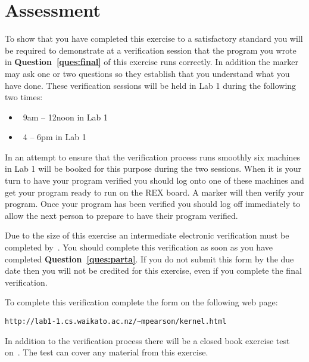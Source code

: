 \documentclass[a4paper,10pt]{article}
\begin{document}

\section{Assessment}

To show that you have completed this exercise to a satisfactory
standard you will be required to demonstrate at a verification session
that the program you wrote in \textbf{Question~\ref{ques:final}} of
this exercise runs correctly. In addition the marker may ask one or
two questions so they establish that you understand what you have
done.  These verification sessions will be held in Lab 1 during the
following two times:

\begin{itemize}
\item \KERNDUE~9am -- 12noon in Lab 1
\item \KERNDUE~4 -- 6pm in Lab 1
\end{itemize}

In an attempt to ensure that the verification process runs smoothly
six machines in Lab 1 will be booked for this purpose during the two
sessions. When it is your turn to have your program verified you
should log onto one of these machines and get your program ready to
run on the REX board. A marker will then verify your program. Once
your program has been verified you should log off immediately to allow
the next person to prepare to have their program verified.

Due to the size of this exercise an intermediate electronic
verification must be completed by~\textbf{\KERNADUE}. You should
complete this verification as soon as you have completed
\textbf{Question~\ref{ques:parta}}. If you do not submit this form by
the due date then you will not be credited for this exercise, even if
you complete the final verification.

To complete this verification complete the form on the following web
page:
\begin{center}
\verb+http://lab1-1.cs.waikato.ac.nz/~mpearson/kernel.html+\\
\end{center}

In addition to the verification process there will be a closed book
exercise test on~\textbf{\KERNTEST}. The test can cover any material
from this exercise.
\end{document}
